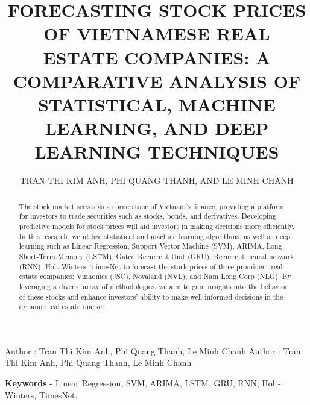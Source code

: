 \documentclass{ieeeojies}
\begin{document}
	\title{FORECASTING STOCK PRICES OF VIETNAMESE REAL ESTATE COMPANIES: A COMPARATIVE ANALYSIS OF STATISTICAL, MACHINE LEARNING, AND DEEP LEARNING TECHNIQUES}
	
	\author{\uppercase{Tran Thi Kim Anh},
		\uppercase{Phi Quang Thanh, and Le Minh Chanh}}
	
	\address[1]{Faculty of Information Systems, University of Information Technology, (e-mail: 21520596@gm.uit.edu.vn)}
	\address[2]{Faculty of Information Systems, University of Information Technology, (e-mail: 21521449@gm.uit.edu.vn)}
	\address[3]{Faculty of Information Systems, University of Information Technology, (e-mail: 21521882@gm.uit.edu.vn)}
	
	\markboth
	{Author \headeretal: Tran Thi Kim Anh, Phi Quang Thanh, Le Minh Chanh}
	{Author \headeretal: Tran Thi Kim Anh, Phi Quang Thanh, Le Minh Chanh}
	
	\begin{abstract}
		The stock market serves as a cornerstone of Vietnam's finance, providing a platform for investors to trade securities such as stocks, bonds, and derivatives. Developing predictive models for stock prices will aid investors in making decisions more efficiently. In this research, we utilize statistical and machine learning algorithms, as well as deep learning such as Linear Regression, Support Vector Machine (SVM), ARIMA, Long Short-Term Memory (LSTM), Gated Recurrent Unit (GRU), Recurrent neural network (RNN), Holt-Winters, TimesNet to forecast the stock prices of three prominent real estate companies: Vinhomes (JSC), Novaland (NVL), and Nam Long Corp (NLG). By leveraging a diverse array of methodologies, we aim to gain insights into the behavior of these stocks and enhance investors' ability to make well-informed decisions in the dynamic real estate market.
	\end{abstract}
	
	\begin{keywords}
		\textbf{Keywords} - Linear Regression, SVM, ARIMA, LSTM, GRU, RNN, Holt-Winters, TimesNet.
	\end{keywords}
	
	\titlepgskip=-15pt
	
	\maketitle
\end{document}
